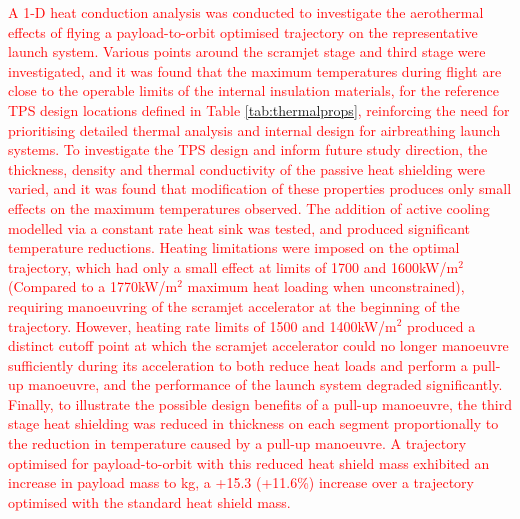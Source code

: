 \textcolor{red}{
	A 1-D heat conduction analysis was conducted to investigate the aerothermal effects of flying a payload-to-orbit optimised trajectory on the representative launch system. 
	Various points around the scramjet stage and third stage were investigated, and it was found that the maximum temperatures during flight are close to the operable limits of the internal insulation materials, for the reference TPS design locations defined in Table \ref{tab:thermalprops}, reinforcing the need for prioritising detailed thermal analysis and internal design for airbreathing launch systems. 
	To investigate the TPS design and inform future study direction, the thickness, density and thermal conductivity of the passive heat shielding were varied, and it was found that modification of these properties produces only small effects on the maximum temperatures observed. The addition of active cooling modelled via a constant rate heat sink was tested, and produced significant temperature reductions. 
	Heating limitations were imposed on the optimal trajectory, which had only a small effect at limits of 1700 and 1600kW/m$^2$ (Compared to a 1770kW/m$^2$ maximum heat loading when unconstrained), requiring manoeuvring of the scramjet accelerator at the beginning of the trajectory. However, heating rate limits of 1500 and 1400kW/m$^2$ produced a distinct cutoff point at which the scramjet accelerator could no longer manoeuvre sufficiently during its acceleration to both reduce heat loads and perform a pull-up manoeuvre, and the performance of the launch system degraded significantly. 
	Finally, to illustrate the possible design benefits of a pull-up manoeuvre, the third stage heat shielding was reduced in thickness on each segment proportionally to the reduction in temperature caused by a pull-up manoeuvre. A trajectory optimised for payload-to-orbit with this reduced heat shield mass exhibited an increase in payload mass to \PayloadToOrbitTPSreduced kg, a +15.3 (+11.6\%) increase over a trajectory optimised with the standard heat shield mass.}
